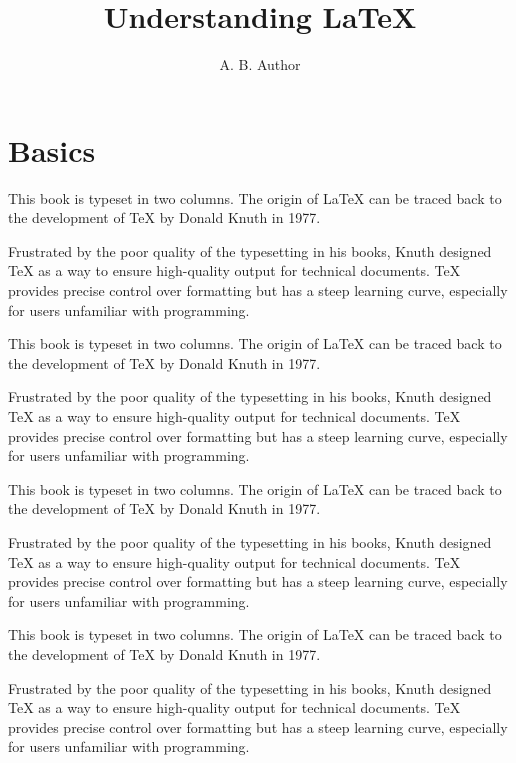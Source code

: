 \documentclass[12pt]{book}
\begin{document}
\title{Understanding LaTeX}
\author{A. B. Author}
\date{}

\maketitle

\chapter{Basics}
This book is typeset in two columns. The origin of \LaTeX{} can be traced back to the development of \TeX{} by Donald Knuth in 1977. 

Frustrated by the poor quality of the typesetting in his books, Knuth designed \TeX{} as a way to ensure high-quality output for technical documents. \TeX{} provides precise control over formatting but has a steep learning curve, especially for users unfamiliar with programming.

\begin{flushright}
This book is typeset in two columns. The origin of \LaTeX{} can be traced back to the development of \TeX{} by Donald Knuth in 1977. 

Frustrated by the poor quality of the typesetting in his books, Knuth designed \TeX{} as a way to ensure high-quality output for technical documents. \TeX{} provides precise control over formatting but has a steep learning curve, especially for users unfamiliar with programming.
\end{flushright}

\begin{flushleft}
This book is typeset in two columns. The origin of \LaTeX{} can be traced back to the development of \TeX{} by Donald Knuth in 1977. 

Frustrated by the poor quality of the typesetting in his books, Knuth designed \TeX{} as a way to ensure high-quality output for technical documents. \TeX{} provides precise control over formatting but has a steep learning curve, especially for users unfamiliar with programming.
\end{flushleft}

\begin{center}
This book is typeset in two columns. The origin of \LaTeX{} can be traced back to the development of \TeX{} by Donald Knuth in 1977.

Frustrated by the poor quality of the typesetting in his books, Knuth designed \TeX{} as a way to ensure high-quality output for technical documents. \TeX{} provides precise control over formatting but has a steep learning curve, especially for users unfamiliar with programming.
\end{center}
\end{document}

